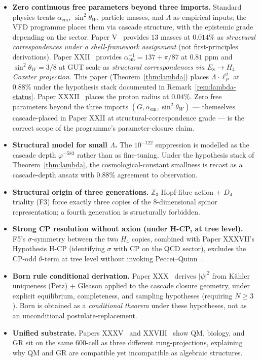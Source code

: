 \documentclass[12pt]{article}
\theoremstyle{definition}
\theoremstyle{remark}
\begin{document}
\begin{itemize}
\item \textbf{Zero continuous free parameters beyond three imports.} Standard physics treats $\alpha_{\mathrm{em}}$, $\sin^2\theta_W$, particle masses, and $\Lambda$ as empirical inputs; the VFD programme places them via cascade structure, with the epistemic grade depending on the sector. Paper V~\citep{SmartV} provides $13$ masses at $0.014\%$ as \emph{structural correspondences under a shell-framework assignment} (not first-principles derivations). Paper XXII~\citep{SmartXXII} provides $\alpha_{\mathrm{em}}^{-1} = 137 + \pi/87$ at $0.81$ ppm and $\sin^2\theta_W = 3/8$ at GUT scale as \emph{structural correspondences via $E_8 \to H_4$ Coxeter projection}. This paper (Theorem~\ref{thm:lambda}) places $\Lambda \cdot \ell_P^2$ at $0.88\%$ under the hypothesis stack documented in Remark~\ref{rem:lambda-status}. Paper XXXII~\citep{SmartXXXII} places the proton radius at $0.04\%$. Zero free parameters beyond the three imports $(G, \alpha_{\mathrm{em}}, \sin^2\theta_W)$ --- themselves cascade-placed in Paper XXII at structural-correspondence grade --- is the correct scope of the programme's parameter-closure claim.
\item \textbf{Structural model for small $\Lambda$.} The $10^{-122}$ suppression is modelled as the cascade depth $\varphi^{-583}$ rather than as fine-tuning. Under the hypothesis stack of Theorem~\ref{thm:lambda}, the cosmological-constant smallness is recast as a cascade-depth ansatz with $0.88\%$ agreement to observation.
\item \textbf{Structural origin of three generations.} $\mathbb{Z}_3$ Hopf-fibre action + $D_4$ triality (F3) force exactly three copies of the 8-dimensional spinor representation; a fourth generation is structurally forbidden.
\item \textbf{Strong CP resolution without axion (under H-CP, at tree level).} F5's $\sigma$-symmetry between the two $H_4$ copies, combined with Paper XXXVII's Hypothesis H-CP (identifying $\sigma$ with CP on the QCD sector), excludes the CP-odd $\theta$-term at tree level without invoking Peccei--Quinn~\citep{SmartXXXVII}.
\item \textbf{Born rule conditional derivation.} Paper XXX~\citep{SmartXXX} derives $|\psi|^2$ from K\"ahler uniqueness (Petz) + Gleason applied to the cascade closure geometry, under explicit equilibrium, completeness, and sampling hypotheses (requiring $N \ge 3$). Born is obtained as a \emph{conditional theorem} under these hypotheses, not as an unconditional postulate-replacement.
\item \textbf{Unified substrate.} Papers XXXV~\citep{SmartXXXV} and XXVIII~\citep{SmartXXVIII} show QM, biology, and GR sit on the same 600-cell as three different rung-projections, explaining why QM and GR are compatible yet incompatible as algebraic structures.
\end{itemize}
\end{document}
